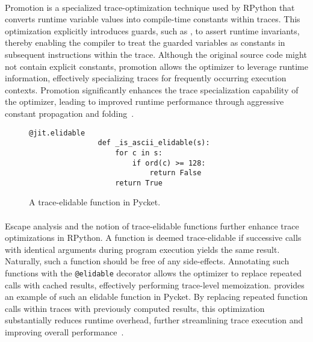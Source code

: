         \paragraph{}%
            Promotion is a specialized trace-optimization technique used by RPython that converts runtime variable values into compile-time constants within traces. This optimization explicitly introduces guards, such as , to assert runtime invariants, thereby enabling the compiler to treat the guarded variables as constants in subsequent instructions within the trace. Although the original source code might not contain explicit constants, promotion allows the optimizer to leverage runtime information, effectively specializing traces for frequently occurring execution contexts. Promotion significantly enhances the trace specialization capability of the optimizer, leading to improved runtime performance through aggressive constant propagation and folding~\cite{bolzPhDThesis}.

        \begin{figure}[!htbp]                    %
            \centering
            \begin{minipage}{0.3\textwidth}
            \begin{lstlisting}[style=python-style,gobble=16]
                @jit.elidable
                def _is_ascii_elidable(s):
                    for c in s:
                        if ord(c) >= 128:
                            return False
                    return True
            \end{lstlisting}
            \end{minipage}
            \caption{A trace-elidable function in Pycket.}
            \label{fig:elidable-function}
        \end{figure}

        \paragraph{}%
            Escape analysis and the notion of trace-elidable functions further enhance trace optimizations in RPython. A function is deemed trace-elidable if successive calls with identical arguments during program execution yields the same result. Naturally, such a function should be free of any side-effects. Annotating such functions with the \texttt{@elidable} decorator allows the optimizer to replace repeated calls with cached results, effectively performing trace-level memoization.  provides an example of such an elidable function in Pycket. By replacing repeated function calls within traces with previously computed results, this optimization substantially reduces runtime overhead, further streamlining trace execution and improving overall performance~\cite{bolzPhDThesis}.
